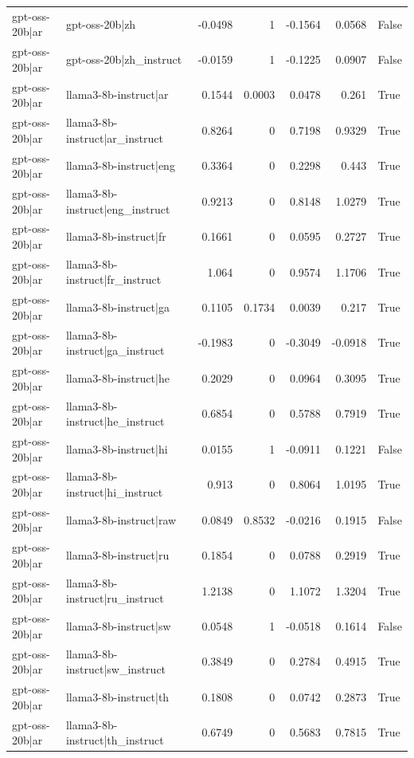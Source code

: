\begin{table}
\begin{tabular}{l l r r r r l}
gpt-oss-20b|ar & gpt-oss-20b|zh & -0.0498 & 1 & -0.1564 & 0.0568 & False \\
gpt-oss-20b|ar & gpt-oss-20b|zh_instruct & -0.0159 & 1 & -0.1225 & 0.0907 & False \\
gpt-oss-20b|ar & llama3-8b-instruct|ar & 0.1544 & 0.0003 & 0.0478 & 0.261 & True \\
gpt-oss-20b|ar & llama3-8b-instruct|ar_instruct & 0.8264 & 0 & 0.7198 & 0.9329 & True \\
gpt-oss-20b|ar & llama3-8b-instruct|eng & 0.3364 & 0 & 0.2298 & 0.443 & True \\
gpt-oss-20b|ar & llama3-8b-instruct|eng_instruct & 0.9213 & 0 & 0.8148 & 1.0279 & True \\
gpt-oss-20b|ar & llama3-8b-instruct|fr & 0.1661 & 0 & 0.0595 & 0.2727 & True \\
gpt-oss-20b|ar & llama3-8b-instruct|fr_instruct & 1.064 & 0 & 0.9574 & 1.1706 & True \\
gpt-oss-20b|ar & llama3-8b-instruct|ga & 0.1105 & 0.1734 & 0.0039 & 0.217 & True \\
gpt-oss-20b|ar & llama3-8b-instruct|ga_instruct & -0.1983 & 0 & -0.3049 & -0.0918 & True \\
gpt-oss-20b|ar & llama3-8b-instruct|he & 0.2029 & 0 & 0.0964 & 0.3095 & True \\
gpt-oss-20b|ar & llama3-8b-instruct|he_instruct & 0.6854 & 0 & 0.5788 & 0.7919 & True \\
gpt-oss-20b|ar & llama3-8b-instruct|hi & 0.0155 & 1 & -0.0911 & 0.1221 & False \\
gpt-oss-20b|ar & llama3-8b-instruct|hi_instruct & 0.913 & 0 & 0.8064 & 1.0195 & True \\
gpt-oss-20b|ar & llama3-8b-instruct|raw & 0.0849 & 0.8532 & -0.0216 & 0.1915 & False \\
gpt-oss-20b|ar & llama3-8b-instruct|ru & 0.1854 & 0 & 0.0788 & 0.2919 & True \\
gpt-oss-20b|ar & llama3-8b-instruct|ru_instruct & 1.2138 & 0 & 1.1072 & 1.3204 & True \\
gpt-oss-20b|ar & llama3-8b-instruct|sw & 0.0548 & 1 & -0.0518 & 0.1614 & False \\
gpt-oss-20b|ar & llama3-8b-instruct|sw_instruct & 0.3849 & 0 & 0.2784 & 0.4915 & True \\
gpt-oss-20b|ar & llama3-8b-instruct|th & 0.1808 & 0 & 0.0742 & 0.2873 & True \\
gpt-oss-20b|ar & llama3-8b-instruct|th_instruct & 0.6749 & 0 & 0.5683 & 0.7815 & True \\

\end{tabular}
\end{table}

